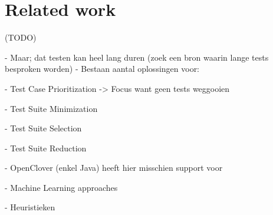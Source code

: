 \chapter{Related work}

	

(TODO)

- Maar; dat testen kan heel lang duren (zoek een bron waarin lange tests besproken worden)
- Bestaan aantal oplossingen voor:

  - Test Case Prioritization -> Focus want geen tests weggooien

- Test Suite Minimization

- Test Suite Selection

- Test Suite Reduction

- OpenClover (enkel Java) heeft hier misschien support voor

- Machine Learning approaches

- Heuristieken